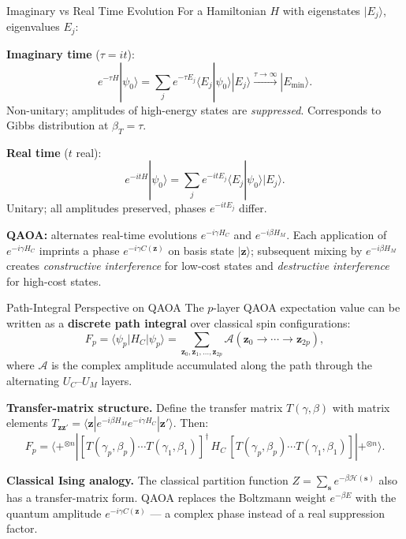 \documentclass{beamer}
\begin{document}
\begin{frame}{Imaginary vs Real Time Evolution}
For a Hamiltonian $H$ with eigenstates $|E_j\rangle$,
eigenvalues $E_j$:

\medskip

\textbf{Imaginary time} ($\tau = it$):
\[
e^{-\tau H}|\psi_0\rangle
= \sum_j e^{-\tau E_j}\langle E_j|\psi_0\rangle|E_j\rangle
\xrightarrow{\tau\to\infty} |E_{\min}\rangle.
\]
Non-unitary; amplitudes of high-energy states are \emph{suppressed}.
Corresponds to Gibbs distribution at $\beta_T = \tau$.

\medskip

\textbf{Real time} ($t$ real):
\[
e^{-itH}|\psi_0\rangle = \sum_j e^{-itE_j}\langle E_j|\psi_0\rangle|E_j\rangle.
\]
Unitary; all amplitudes preserved, phases $e^{-itE_j}$ differ.

\medskip

\textbf{QAOA:} alternates real-time evolutions $e^{-i\gamma H_C}$
and $e^{-i\beta H_M}$.  Each application of $e^{-i\gamma H_C}$
imprints a phase $e^{-i\gamma C(\mathbf{z})}$ on basis state
$|\mathbf{z}\rangle$; subsequent mixing by $e^{-i\beta H_M}$
creates \emph{constructive interference} for low-cost states
and \emph{destructive interference} for high-cost states.
\end{frame}


\begin{frame}{Path-Integral Perspective on QAOA}
The $p$-layer QAOA expectation value can be written as a
\textbf{discrete path integral} over classical spin configurations:
\[
F_p = \langle\psi_p|H_C|\psi_p\rangle
= \sum_{\mathbf{z}_0,\mathbf{z}_1,\dots,\mathbf{z}_{2p}}
  \mathcal{A}(\mathbf{z}_0\to\cdots\to\mathbf{z}_{2p}),
\]
where $\mathcal{A}$ is the complex amplitude accumulated along
the path through the alternating $U_C$--$U_M$ layers.

\medskip

\textbf{Transfer-matrix structure.}  Define the transfer matrix
$T(\gamma,\beta)$ with matrix elements
$T_{\mathbf{z}\mathbf{z}'} = \langle\mathbf{z}|e^{-i\beta H_M}e^{-i\gamma H_C}|\mathbf{z}'\rangle$.
Then:
\[
F_p = \langle{+}^{\otimes n}|
[T(\gamma_p,\beta_p)\cdots T(\gamma_1,\beta_1)]^\dagger\,H_C\,
[T(\gamma_p,\beta_p)\cdots T(\gamma_1,\beta_1)]
|{+}^{\otimes n}\rangle.
\]

\textbf{Classical Ising analogy.} The classical partition function
$Z = \sum_\mathbf{s} e^{-\beta\mathcal{H}(\mathbf{s})}$ also has a
transfer-matrix form. QAOA replaces the Boltzmann weight
$e^{-\beta E}$ with the quantum amplitude $e^{-i\gamma C(\mathbf{z})}$
--- a complex phase instead of a real suppression factor.
\end{frame}
\end{document}
